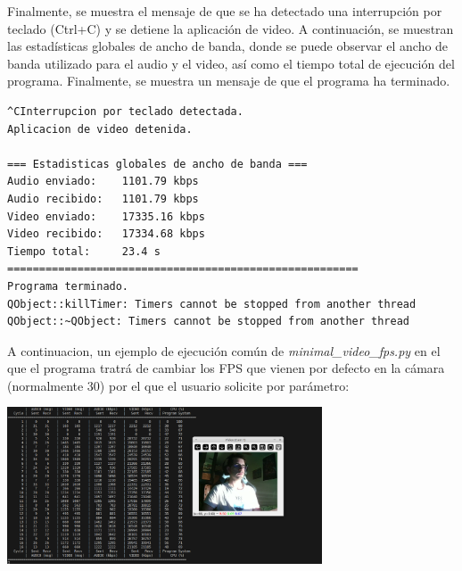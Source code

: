 Finalmente, se muestra el mensaje de que se ha detectado una interrupción por teclado (Ctrl+C) y se detiene la aplicación de video. A continuación, se muestran las estadísticas globales de ancho de banda, donde se puede observar el ancho de banda utilizado para el audio y el video, así como el tiempo total de ejecución del programa. Finalmente, se muestra un mensaje de que el programa ha terminado.
\begin{lstlisting}[language=bash,basicstyle=\ttfamily\scriptsize]
^CInterrupcion por teclado detectada.
Aplicacion de video detenida.

=== Estadisticas globales de ancho de banda ===
Audio enviado:    1101.79 kbps
Audio recibido:   1101.79 kbps
Video enviado:    17335.16 kbps
Video recibido:   17334.68 kbps
Tiempo total:     23.4 s
=======================================================
Programa terminado.
QObject::killTimer: Timers cannot be stopped from another thread
QObject::~QObject: Timers cannot be stopped from another thread
\end{lstlisting}
\vspace{\baselineskip}

A continuacion, un ejemplo de ejecución común de \textit{minimal\_video\_fps.py} en el que el programa tratrá de cambiar los FPS que vienen por defecto en la cámara (normalmente 30) por el que el usuario solicite por parámetro:
\begin{center}
	\includegraphics[width = 0.7\textwidth]{images/pruebas/ejecuion_normal_fps.png}
	\label{fig:ejecucion_fps}
\end{center}
\vspace{\baselineskip}

